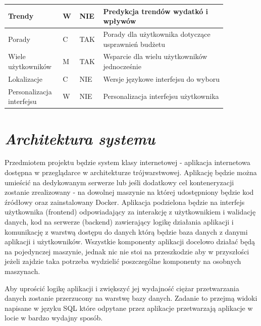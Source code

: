 \documentclass[a4paper,10pt, twoside]{report}
\newcommand{\customstylesection}[1]{\textbf{\textit{#1}}}
\begin{document}
\begin{large}
\begin{table}[H]
\begin{tabular}{|p{0.2\linewidth}|p{0.07\linewidth}|p{0.07\linewidth}|p{0.52\linewidth}|}
    \hline
    {Trendy} & {W} & {NIE} & {Predykcja trendów wydatkó i wpływów}\\
    \hline
    {Porady} & {C} & {TAK} & {Porady dla użytkownika dotyczące usprawnień budżetu}\\
    \hline
    {Wiele użytkowników} & {M} & {TAK} & {Wsparcie dla wielu użytkowników jednocześnie}\\
    \hline
    {Lokalizacje} & {C} & {NIE} & {Wersje językowe interfejsu do wyboru}\\
    \hline
    {Personalizacja interfejsu} & {W} & {NIE} & {Personalizacja interfejsu użytkownika}\\
    \hline
    \end{tabular}
\end{table}

\section{\customstylesection{Architektura systemu}}
{Przedmiotem projektu będzie system klasy internetowej - aplikacja internetowa 
dostępna w przeglądarce w architekturze trójwarstwowej. Aplikację będzie można 
umieścić na dedykowanym serwerze lub jeśli dodatkowy cel konteneryzacji zostanie
 zrealizowany - na dowolnej maszynie na której udostępniony będzie kod źródłowy 
oraz zainstalowany Docker. Aplikacja podzielona będzie na interfejs użytkownika 
(frontend) odpowiadający za interakcję z użytkownikiem i walidację danych, kod 
na serwerze (backend) zawierający logikę działania aplikacji i komunikację z 
warstwą dostępu do danych którą będzie baza danych z danymi aplikacji i 
użytkowników. Wszystkie komponenty aplikacji docelowo działać będą na 
pojedynczej maszynie, jednak nic nie stoi na przeszkodzie aby w przyszłości 
jeżeli zajdzie taka potrzeba wydzielić poszczególne komponenty na osobnych 
maszynach.}

{Aby uprościć logikę aplikacji i zwiększyć jej wydajność ciężar przetwarzania 
danych zostanie przerzucony na warstwę bazy danych. Zadanie to przejmą widoki 
napisane w języku SQL\cite{SQL} które odpytane przez aplikacje przetwarzają 
aplikacje w locie w bardzo wydajny sposób.}


\end{large}
\end{document}
